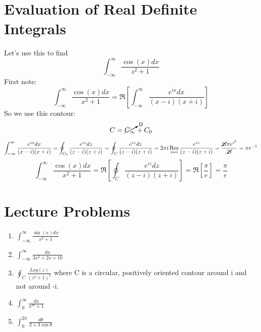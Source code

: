 \documentclass[11pt,notitlepage]{article}
\DeclareMathOperator*{\res}{Res}
\begin{document}
\section{Evaluation of Real Definite Integrals}
Let's use this to find $$\int_{-\infty}^{\infty} \frac{\cos(x)dx}{z^2+1}$$
First note: $$\int_{-\infty}^{\infty} \frac{\cos(x)dx}{x^2+1} = \Re\left[\int_{-\infty}^{\infty} \frac{e^{ix}dx}{(x-i)(x+i)}\right]$$
So we use this contour: $$C = \cancelto0{C_\infty} + C_0$$
$$ \int_{-\infty}^{\infty} \frac{e^{ix}dx}{(x-i)(x+i)} = \oint_{C_0} \frac{e^{iz}dz}{(z-i)(z+i)} = \oint_C \frac{e^{iz}dz}{(z-i)(z+i)} = 2\pi i\res_{z=i}\frac{e^{iz}}{(z-i)(z+i)} = \frac{\cancel{2i}\pi e^{i^2}}{\cancel{2i}}=\pi e^{-1}$$
$$ \int_{-\infty}^{\infty} \frac{\cos(x)dx}{x^2+1} =\Re\left[\oint_C \frac{e^{iz}dz}{(z-i)(z+i)}\right] =\Re\left[\frac\pi e\right] =\frac\pi e$$
\section{Lecture Problems}
\begin{enumerate}
\item $\int_{-\infty}^{\infty} \frac{\sin(x)dx}{x^2+1}$
\item $\int_{-\infty}^{\infty} \frac{dx}{3x^2+2x+10}$
\item $\oint_C \frac{Log(z)}{(z^2+1)^2}$ where C is a circular, positively oriented contour around i and not around -i.
\item $\int_{0}^{\infty} \frac{dx}{x^m+1}$
\item $\int_0^{2\pi}\frac{d\theta}{2+3\cos{\theta}}$
\end{enumerate}
\end{document}

